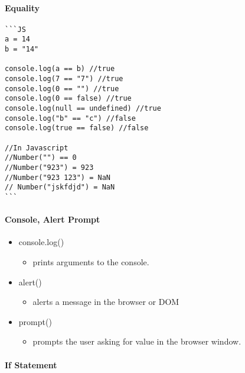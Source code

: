 \documentclass[
  paper=a4,
  ,captions=tableheading
]{scrartcl}
\providecommand{\tightlist}{%
  \setlength{\itemsep}{0pt}\setlength{\parskip}{0pt}}
\begin{document}
\hypertarget{equality}{%
\paragraph{Equality}\label{equality}}

\begin{verbatim}
```JS
a = 14
b = "14"

console.log(a == b) //true
console.log(7 == "7") //true
console.log(0 == "") //true
console.log(0 == false) //true
console.log(null == undefined) //true
console.log("b" == "c") //false
console.log(true == false) //false

//In Javascript 
//Number("") == 0
//Number("923") = 923
//Number("923 123") = NaN
// Number("jskfdjd") = NaN
```
\end{verbatim}

\hypertarget{console-alert-prompt}{%
\paragraph{Console, Alert Prompt}\label{console-alert-prompt}}

\begin{itemize}
\tightlist
\item
  console.log()

  \begin{itemize}
  \tightlist
  \item
    prints arguments to the console.
  \end{itemize}
\item
  alert()

  \begin{itemize}
  \tightlist
  \item
    alerts a message in the browser or DOM
  \end{itemize}
\item
  prompt()

  \begin{itemize}
  \tightlist
  \item
    prompts the user asking for value in the browser window.
  \end{itemize}
\end{itemize}

\hypertarget{if-statement}{%
\paragraph{If Statement}\label{if-statement}}
\end{document}
